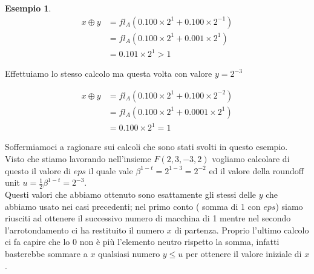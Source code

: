 \documentclass[12pt, a4paper]{book}
\theoremstyle{definition}
\newtheorem{exmp}{Esempio}[section]
\begin{document}
\begin{flushleft}
\begin{exmp}
\begin{equation} \label{}
	\begin{split}
		x \oplus y & = fl_{A}(0.100 \times 2^{1} +  0.100 \times 2^{-1}) \\
 		   				& =  fl_{A}(0.100 \times 2^{1} +  0.001 \times 2^{1}) \\
 		   				& =  0.101 \times 2^{1} > 1
	\end{split}
\end{equation}

Effettuiamo lo stesso calcolo ma questa volta con valore $y=2^{-3}$

\begin{equation} \label{}
	\begin{split}
		x \oplus y & = fl_{A}(0.100 \times 2^{1} +  0.100 \times 2^{-2}) \\
 		   				& =  fl_{A}(0.100 \times 2^{1} +  0.0001 \times 2^{1}) \\
 		   				& =  0.100 \times 2^{1} = 1
	\end{split}
\end{equation}

Soffermiamoci a ragionare sui calcoli che sono stati svolti in questo esempio. Visto che stiamo lavorando nell'insieme $F(2,3,-3,2)$ vogliamo calcolare di questo il valore di $eps$ il quale vale $\beta^{1-t} = 2 ^ {1-3} = 2^{-2}$ ed il valore della roundoff unit $u = \frac{1}{2}\beta^{1-t} = 2^{-3}$.\\
Questi valori che abbiamo ottenuto sono esattamente gli stessi delle $y$ che abbiamo usato nei casi precedenti; nel primo conto ( somma di 1 con $eps$) siamo riusciti ad ottenere il successivo numero di macchina di 1 mentre nel secondo l'arrotondamento ci ha restituito il numero $x$ di partenza.
Proprio l'ultimo calcolo ci fa capire che lo 0 non è più l'elemento neutro rispetto la somma,  infatti basterebbe sommare a $x$ qualsiasi numero $y \leq u$ per ottenere il valore iniziale di $x$.
\end{exmp}
\end{flushleft}
\end{document}

